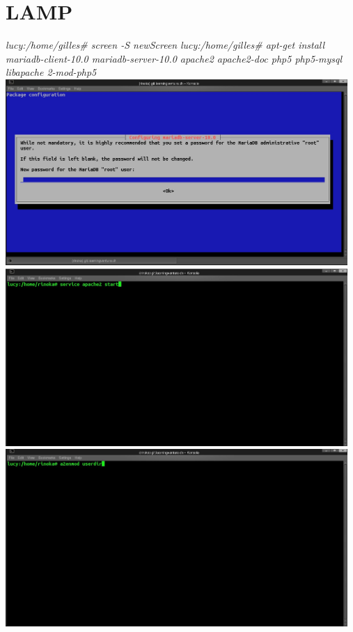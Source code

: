 \documentclass{article}
\begin{document}
	\section{LAMP}
	\textit{lucy:/home/gilles\# screen -S newScreen}
	\newline
	\textit{lucy:/home/gilles\# apt-get install mariadb-client-10.0 mariadb-server-10.0 apache2 apache2-doc php5 php5-mysql libapache 2-mod-php5}
	\newline
	\includegraphics[width=13cm]{../Pics/3-lamp-stack-mariadb}
	\includegraphics[width=13cm]{../Pics/start_apache}
	\includegraphics[width=13cm]{../Pics/a2enmod_userdir}
\end{document}
